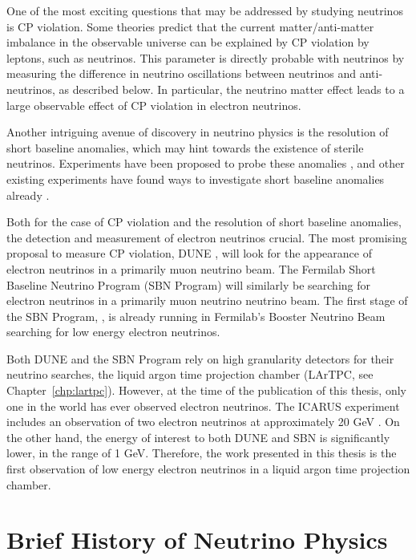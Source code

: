 One of the most exciting questions that may be addressed by studying neutrinos is CP violation.  Some theories predict that the current matter/anti-matter imbalance in the observable universe can be explained by CP violation by leptons, such as neutrinos. \cite{CP_theories}  This parameter is directly probable with neutrinos by measuring the difference in neutrino oscillations between neutrinos and anti-neutrinos, as described below.  In particular, the neutrino matter effect \cite{matter_effect} leads to a large observable effect of CP violation in electron neutrinos.

Another intriguing avenue of discovery in neutrino physics is the resolution of short baseline anomalies, which may hint towards the existence of sterile neutrinos.  Experiments have been proposed to probe these anomalies \cite{SBN, prospect}, and other existing experiments have found ways to investigate short baseline anomalies already \cite{icecube, nova_steriles, minos_steriles, daya_bay_steriles}.

Both for the case of CP violation and the resolution of short baseline anomalies, the detection and measurement of electron neutrinos crucial.  The most promising proposal to measure CP violation, DUNE \cite{dune}, will look for the appearance of electron neutrinos in a primarily muon neutrino beam.  The Fermilab Short Baseline Neutrino Program (SBN Program) \cite{SBN} will similarly be searching for electron neutrinos in a primarily muon neutrino neutrino beam.  The first stage of the SBN Program, \uboone, is already running in Fermilab's Booster Neutrino Beam searching for low energy electron neutrinos.

Both DUNE and the SBN Program rely on high granularity detectors for their neutrino searches, the liquid argon time projection chamber (LArTPC, see Chapter~\ref{chp:lartpc}).  However, at the time of the publication of this thesis, only one \lartpc in the world has ever observed electron neutrinos.  The ICARUS experiment includes an observation of two electron neutrinos at approximately 20 GeV \cite{ICARUS_steriles}.  On the other hand, the energy of interest to both DUNE and SBN is significantly lower, in the range of 1 GeV.  Therefore, the work presented in this thesis is the first observation of low energy electron neutrinos in a liquid argon time projection chamber.   

\section{Brief History of Neutrino Physics}

